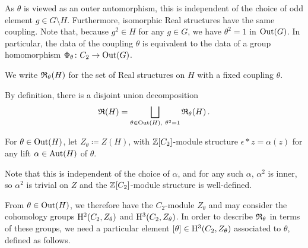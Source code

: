 As $\theta$ is viewed as an outer automorphism, this is independent of the choice of odd element $g \in G \setminus H$. Furthermore, isomorphic Real structures have the same coupling.
Note that, because $g^2\in H$ for any $g\in G$, we have $\theta^2 = 1$ in $\operatorname{Out}(G)$. In particular, the data of the coupling $\theta$ is equivalent to the data of a group homomorphism $\Phi_{\theta} \colon C_2 \rightarrow \operatorname{Out}(G)$.

\begin{defn}
We write ${\mathfrak R}_{\theta}(H)$ for the set of Real structures on $H$ with a fixed coupling $\theta$.
\end{defn}
By definition, there is a disjoint union decomposition
\begin{equation} \label{RealStr:RTheta}
{\mathfrak R}(H) = \bigsqcup_{\theta \in \operatorname{Out}(H), \ \theta^2 =1} {\mathfrak R}_{\theta}(H) \, . 
\end{equation}

\begin{defn}
  For $\theta \in \operatorname{Out}(H)$, let $Z_{\theta} \coloneqq Z(H)$, with ${\mathbb Z}[C_2]$-module structure $\epsilon * z = \alpha(z)$ for any lift $\alpha \in \operatorname{Aut}(H)$ of $\theta$.
\end{defn}

Note that this is independent of the choice of $\alpha$, and for any such $\alpha$, $\alpha^2$ is inner, so $\alpha^2$ is trivial on $Z$ and the ${\mathbb Z}[C_2]$-module structure is well-defined. 

From $\theta \in \operatorname{Out}(H)$, we therefore have the $C_2$-module $Z_{\theta}$ and may consider the cohomology groups $\mathrm{H}^2(C_2, Z_{\theta})$ and $\mathrm{H}^3(C_2, Z_{\theta})$. In order to describe ${\mathfrak R}_{\theta}$ in terms of these groups, we need a particular element $[\theta] \in \mathrm{H}^3(C_2, Z_{\theta})$ associated to $\theta$, defined as follows.

